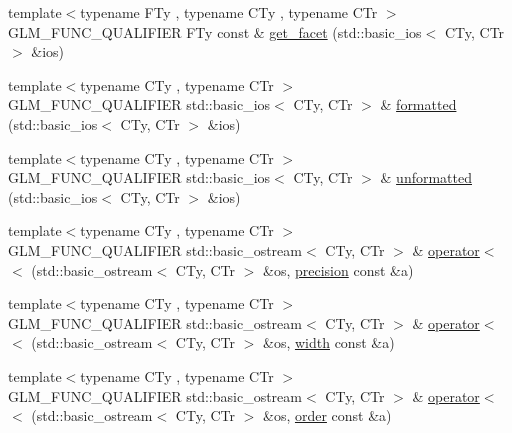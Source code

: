 \begin{DoxyCompactItemize}
\item 
{\footnotesize template$<$typename F\+Ty , typename C\+Ty , typename C\+Tr $>$ }\\G\+L\+M\+\_\+\+F\+U\+N\+C\+\_\+\+Q\+U\+A\+L\+I\+F\+I\+E\+R F\+Ty const \& \hyperlink{namespaceglm_1_1io_a9e8927cf032254b0eee4ec650286e1f9}{get\+\_\+facet} (std\+::basic\+\_\+ios$<$ C\+Ty, C\+Tr $>$ \&ios)
\item 
{\footnotesize template$<$typename C\+Ty , typename C\+Tr $>$ }\\G\+L\+M\+\_\+\+F\+U\+N\+C\+\_\+\+Q\+U\+A\+L\+I\+F\+I\+E\+R std\+::basic\+\_\+ios$<$ C\+Ty, C\+Tr $>$ \& \hyperlink{namespaceglm_1_1io_a61bbd0ea648623b0b07215a986bd5aa5}{formatted} (std\+::basic\+\_\+ios$<$ C\+Ty, C\+Tr $>$ \&ios)
\item 
{\footnotesize template$<$typename C\+Ty , typename C\+Tr $>$ }\\G\+L\+M\+\_\+\+F\+U\+N\+C\+\_\+\+Q\+U\+A\+L\+I\+F\+I\+E\+R std\+::basic\+\_\+ios$<$ C\+Ty, C\+Tr $>$ \& \hyperlink{namespaceglm_1_1io_a833a8c96b3d84f7aa76e0c3e6845503e}{unformatted} (std\+::basic\+\_\+ios$<$ C\+Ty, C\+Tr $>$ \&ios)
\item 
{\footnotesize template$<$typename C\+Ty , typename C\+Tr $>$ }\\G\+L\+M\+\_\+\+F\+U\+N\+C\+\_\+\+Q\+U\+A\+L\+I\+F\+I\+E\+R std\+::basic\+\_\+ostream$<$ C\+Ty, C\+Tr $>$ \& \hyperlink{namespaceglm_1_1io_ac52a8c5f8ea189f5bae2e5b8e382675f}{operator$<$$<$} (std\+::basic\+\_\+ostream$<$ C\+Ty, C\+Tr $>$ \&os, \hyperlink{structglm_1_1io_1_1precision}{precision} const \&a)
\item 
{\footnotesize template$<$typename C\+Ty , typename C\+Tr $>$ }\\G\+L\+M\+\_\+\+F\+U\+N\+C\+\_\+\+Q\+U\+A\+L\+I\+F\+I\+E\+R std\+::basic\+\_\+ostream$<$ C\+Ty, C\+Tr $>$ \& \hyperlink{namespaceglm_1_1io_ac4783e4e3b0384619625d5d2d00c27b8}{operator$<$$<$} (std\+::basic\+\_\+ostream$<$ C\+Ty, C\+Tr $>$ \&os, \hyperlink{structglm_1_1io_1_1width}{width} const \&a)
\item 
{\footnotesize template$<$typename C\+Ty , typename C\+Tr $>$ }\\G\+L\+M\+\_\+\+F\+U\+N\+C\+\_\+\+Q\+U\+A\+L\+I\+F\+I\+E\+R std\+::basic\+\_\+ostream$<$ C\+Ty, C\+Tr $>$ \& \hyperlink{namespaceglm_1_1io_a4dab7c825ecbd918643ed9fc9ef4ecb6}{operator$<$$<$} (std\+::basic\+\_\+ostream$<$ C\+Ty, C\+Tr $>$ \&os, \hyperlink{structglm_1_1io_1_1order}{order} const \&a)
\end{DoxyCompactItemize}


